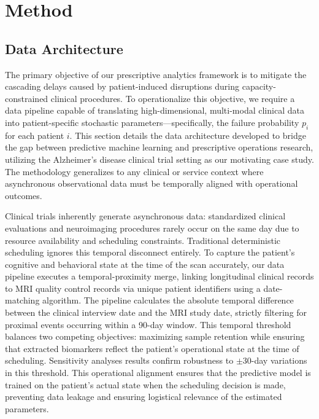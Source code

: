 \documentclass[msom,blindrev]{informs3}
\begin{document}
\section{Method}


\subsection{Data Architecture}
\label{sec:data_architecture}

The primary objective of our prescriptive analytics framework is to mitigate the cascading delays caused by patient-induced disruptions during capacity-constrained clinical procedures. To operationalize this objective, we require a data pipeline capable of translating high-dimensional, multi-modal clinical data into patient-specific stochastic parameters---specifically, the failure probability $p_i$ for each patient $i$. This section details the data architecture developed to bridge the gap between predictive machine learning and prescriptive operations research, utilizing the Alzheimer's disease clinical trial setting as our motivating case study. The methodology generalizes to any clinical or service context where asynchronous observational data must be temporally aligned with operational outcomes.

Clinical trials inherently generate asynchronous data: standardized clinical evaluations and neuroimaging procedures rarely occur on the same day due to resource availability and scheduling constraints. Traditional deterministic scheduling ignores this temporal disconnect entirely. To capture the patient's cognitive and behavioral state at the time of the scan accurately, our data pipeline executes a temporal-proximity merge, linking longitudinal clinical records to MRI quality control records via unique patient identifiers using a date-matching algorithm. The pipeline calculates the absolute temporal difference between the clinical interview date and the MRI study date, strictly filtering for proximal events occurring within a 90-day window. This temporal threshold balances two competing objectives: maximizing sample retention while ensuring that extracted biomarkers reflect the patient's operational state at the time of scheduling. Sensitivity analyses results confirm robustness to $\pm$30-day variations in this threshold. This operational alignment ensures that the predictive model is trained on the patient's actual state when the scheduling decision is made, preventing data leakage and ensuring logistical relevance of the estimated parameters.
\end{document}

